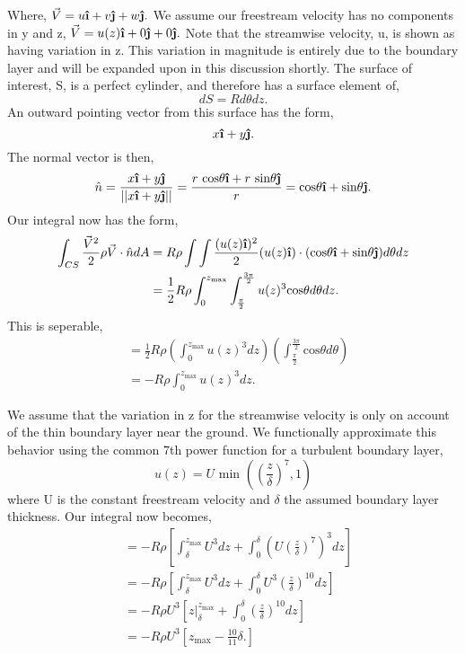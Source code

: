 \documentclass{article}
\newcommand{\uveci}{{\bm{\hat{\textnormal{\bfseries\i}}}}}
\newcommand{\uvecj}{{\bm{\hat{\textnormal{\bfseries\j}}}}}
\begin{document}
Where, $\vec V = u \uveci + v \uvecj + w \uvecj.$ 
We assume our freestream velocity has no components in y and z, 
$\vec V = u(z) \uveci + 0 \uvecj + 0 \uvecj.$ Note that the 
streamwise velocity, u, is shown as having variation in z. 
This variation in magnitude is entirely due to the boundary layer 
and will be expanded upon in this discussion shortly.
The surface of interest, S,
is a perfect cylinder, and therefore has a surface element of, 
\begin{equation*}
dS = Rd\theta dz. 
\end{equation*}
An outward pointing vector from this surface has the form, 
\begin{equation*}
x \uveci + y \uvecj. 
\end{equation*}
The normal vector is then,
\begin{equation*}
\hat n = \frac{x \uveci + y \uvecj }{||x \uveci + y \uvecj||} =
 \frac{r\text{ cos}\theta \uveci + r\text{ sin}\theta \uvecj}{r} =
 \text{cos}\theta \uveci + \text{sin}\theta \uvecj. 
\end{equation*}
Our integral now has the form, 
\begin{align*}
\int_{CS} \frac{\vec V^2}{2} \rho \vec V \cdot \hat n dA & = R \rho \int
 \int \frac{(u(z) \uveci)^2}{2} (u(z) \uveci) \cdot
 (\text{cos}\theta \uveci + \text{sin}\theta \uvecj) d\theta dz \\
 & = \frac{1}{2} R \rho \int^{z_\text{max}}_0
 \int^{\frac{3\pi}{2}}_{\frac{\pi}{2}}  u(z)^3 \text{cos}\theta d\theta dz.
\end{align*}
This is seperable, 
\begin{align*}
 & = \frac{1}{2} R \rho \left( \int^{z_\text{max}}_0 u(z)^3 dz \right)
 \left(\int^{\frac{3\pi}{2}}_{\frac{\pi}{2}} \text{cos}\theta d\theta
 \right) \\
 & = -R \rho \int^{z_\text{max}}_0 u(z)^3 dz. 
\end{align*}

We assume that the variation in z for the streamwise velocity is only on account 
of the thin boundary layer near the ground. We functionally approximate this behavior 
using the common 7th power function for a turbulent boundary layer, 
\begin{equation*}
  u(z) = U \text{ min }\left(\left(\frac{z}{\delta}\right)^7,1\right)
\end{equation*}
where U is the constant freestream velocity and $\delta$ the assumed boundary 
layer thickness. Our integral now becomes, 
\begin{align*}
 & = -R \rho \left[ \int^{z_\text{max}}_\delta U^3 dz
 + \int^{\delta}_0 \left(U\left(\frac{z}{\delta}\right)^7
 \right)^3 dz \right] \\
 & = -R \rho \left[ \int^{z_\text{max}}_\delta U^3 dz
 + \int^{\delta}_0 U^3 \left(\frac{z}{\delta} \right)^{10} dz \right] \\
 & = -R \rho U^3 \left[ z \bigg|^{z_{\text{max}}}_{\delta}
 + \int^{\delta}_0 \left(\frac{z}{\delta} \right)^{10} dz \right] \\
& = -R \rho U^3 \left[ z_{\text{max}} - \frac{10}{11}\delta.
\right]
\end{align*}
\end{document}

